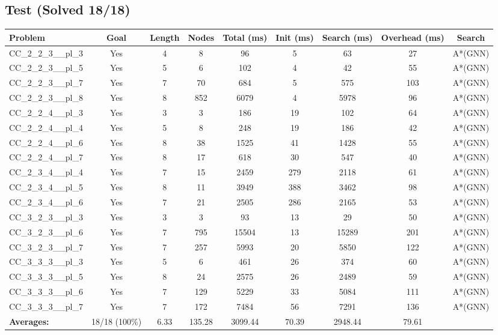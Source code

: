 \documentclass{article}
\begin{document}
\subsection*{Test (Solved 18/18)}
\begin{tabular}{lcccccccc}
\toprule
Problem & Goal & Length & Nodes & Total (ms) & Init (ms) & Search (ms) & Overhead (ms) & Search \\
\midrule
CC\_2\_2\_3\_\_pl\_3 & Yes & 4 & 8 & 96 & 5 & 63 & 27 & A*(GNN) \\
CC\_2\_2\_3\_\_pl\_5 & Yes & 5 & 6 & 102 & 4 & 42 & 55 & A*(GNN) \\
CC\_2\_2\_3\_\_pl\_7 & Yes & 7 & 70 & 684 & 5 & 575 & 103 & A*(GNN) \\
CC\_2\_2\_3\_\_pl\_8 & Yes & 8 & 852 & 6079 & 4 & 5978 & 96 & A*(GNN) \\
CC\_2\_2\_4\_\_pl\_3 & Yes & 3 & 3 & 186 & 19 & 102 & 64 & A*(GNN) \\
CC\_2\_2\_4\_\_pl\_4 & Yes & 5 & 8 & 248 & 19 & 186 & 42 & A*(GNN) \\
CC\_2\_2\_4\_\_pl\_6 & Yes & 8 & 38 & 1525 & 41 & 1428 & 55 & A*(GNN) \\
CC\_2\_2\_4\_\_pl\_7 & Yes & 8 & 17 & 618 & 30 & 547 & 40 & A*(GNN) \\
CC\_2\_3\_4\_\_pl\_4 & Yes & 7 & 15 & 2459 & 279 & 2118 & 61 & A*(GNN) \\
CC\_2\_3\_4\_\_pl\_5 & Yes & 8 & 11 & 3949 & 388 & 3462 & 98 & A*(GNN) \\
CC\_2\_3\_4\_\_pl\_6 & Yes & 7 & 21 & 2505 & 286 & 2165 & 53 & A*(GNN) \\
CC\_3\_2\_3\_\_pl\_3 & Yes & 3 & 3 & 93 & 13 & 29 & 50 & A*(GNN) \\
CC\_3\_2\_3\_\_pl\_6 & Yes & 7 & 795 & 15504 & 13 & 15289 & 201 & A*(GNN) \\
CC\_3\_2\_3\_\_pl\_7 & Yes & 7 & 257 & 5993 & 20 & 5850 & 122 & A*(GNN) \\
CC\_3\_3\_3\_\_pl\_3 & Yes & 5 & 6 & 461 & 26 & 374 & 60 & A*(GNN) \\
CC\_3\_3\_3\_\_pl\_5 & Yes & 8 & 24 & 2575 & 26 & 2489 & 59 & A*(GNN) \\
CC\_3\_3\_3\_\_pl\_6 & Yes & 7 & 129 & 5229 & 33 & 5084 & 111 & A*(GNN) \\
CC\_3\_3\_3\_\_pl\_7 & Yes & 7 & 172 & 7484 & 56 & 7291 & 136 & A*(GNN) \\
\textbf{Averages:} & 18/18 (100\%) & 6.33 & 135.28 & 3099.44 & 70.39 & 2948.44 & 79.61 & \\
\bottomrule
\end{tabular}
\\[0.7cm]
\end{document}
